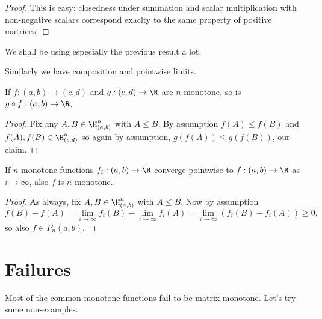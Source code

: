 \begin{proof}
	This is easy: closedness under summation and scalar multiplication with non-negative scalars correspond exaclty to the same property of positive matrices.
\end{proof}

We shall be using especially the previous result a lot.

Similarly we have composition and pointwise limits.

\begin{prop}
	If $f : (a, b) \to (c, d)$ and $g : (c, d) \to \R$ are $n$-monotone, so is $g \circ f : (a, b) \to \R$.
\end{prop}
\begin{proof}
	Fix any $A, B \in \H^{n}_{(a, b)}$ with $A \leq B$. By assumption $f(A) \leq f(B)$ and $f(A), f(B) \in \H^{n}_{(c, d)}$ so again by assumption, $g(f(A)) \leq g(f(B))$, our claim.
\end{proof}

\begin{prop}
	If $n$-monotone functions $f_{i} : (a, b) \to \R$ converge pointwise to $f : (a, b) \to \R$ as $i \to \infty$, also $f$ is $n$-monotone.
\end{prop}
\begin{proof}
	As always, fix $A, B \in \H^{n}_{(a, b)}$ with $A \leq B$. Now by assumption
	\[
		f(B) - f(A) = \lim_{i \to \infty} f_{i}(B) - \lim_{i \to \infty} f_{i}(A) = \lim_{i \to \infty} \left(f_{i}(B) - f_{i}(A)\right) \geq 0,
	\]
	so also $f \in P_{n}(a, b)$.
\end{proof}


\section{Failures}

Most of the common monotone functions fail to be matrix monotone. Let's try some non-examples.

